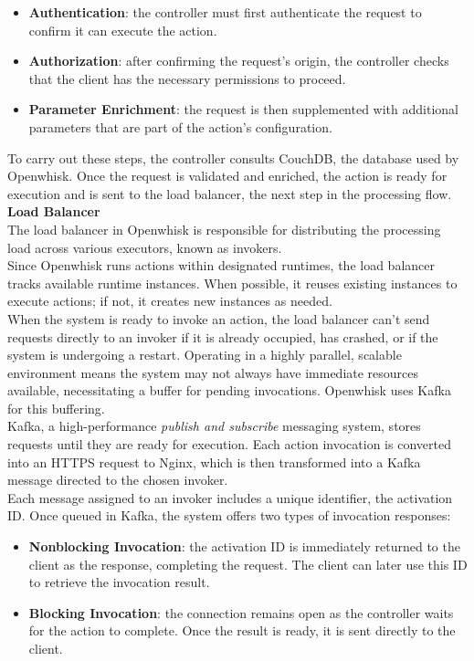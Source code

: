 \begin{itemize}
    \item \textbf{Authentication}: the controller must first authenticate the request to confirm it can execute the action.
    \item \textbf{Authorization}: after confirming the request’s origin, the controller checks that the client has the necessary permissions to proceed.
    \item \textbf{Parameter Enrichment}: the request is then supplemented with additional parameters that are part of the action’s configuration.
\end{itemize}
To carry out these steps, the controller consults CouchDB, the database used by Openwhisk. Once the request is validated and enriched, the action is ready for execution and is sent to the load balancer, the next step in the processing flow.\vspace{14pt}\\
\textbf{Load Balancer}\\
The load balancer in Openwhisk is responsible for distributing the processing load across various executors, known as invokers.\\
Since Openwhisk runs actions within designated runtimes, the load balancer tracks available runtime instances. When possible, it reuses existing instances to execute actions; if not, it creates new instances as needed.\vspace{14pt}\\
When the system is ready to invoke an action, the load balancer can't send requests directly to an invoker if it is already occupied, has crashed, or if the system is undergoing a restart. Operating in a highly parallel, scalable environment means the system may not always have immediate resources available, necessitating a buffer for pending invocations. Openwhisk uses Kafka for this buffering.\vspace{14pt}\\
Kafka, a high-performance \textit{publish and subscribe} messaging system, stores requests until they are ready for execution. Each action invocation is converted into an HTTPS request to Nginx, which is then transformed into a Kafka message directed to the chosen invoker.\\
Each message assigned to an invoker includes a unique identifier, the activation ID. Once queued in Kafka, the system offers two types of invocation responses:
\begin{itemize}
    \item \textbf{Nonblocking Invocation}: the activation ID is immediately returned to the client as the response, completing the request. The client can later use this ID to retrieve the invocation result.
    \item \textbf{Blocking Invocation}: the connection remains open as the controller waits for the action to complete. Once the result is ready, it is sent directly to the client.
\end{itemize}
